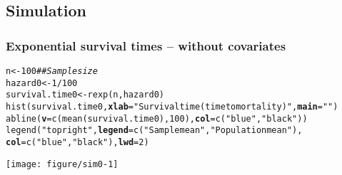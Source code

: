 \documentclass[color=usenames,dvipsnames]{beamer}\usepackage[]{graphicx}\usepackage[]{color}
\makeatletter
\newcommand{\hlnum}[1]{\textcolor[rgb]{0.69,0.494,0}{#1}}%
\newcommand{\hlstr}[1]{\textcolor[rgb]{0.749,0.012,0.012}{#1}}%
\newcommand{\hlcom}[1]{\textcolor[rgb]{0.514,0.506,0.514}{\textit{#1}}}%
\newcommand{\hlopt}[1]{\textcolor[rgb]{0,0,0}{#1}}%
\newcommand{\hlstd}[1]{\textcolor[rgb]{0,0,0}{#1}}%
\newcommand{\hlkwb}[1]{\textcolor[rgb]{0,0.341,0.682}{#1}}%
\newcommand{\hlkwc}[1]{\textcolor[rgb]{0,0,0}{\textbf{#1}}}%
\newcommand{\hlkwd}[1]{\textcolor[rgb]{0.004,0.004,0.506}{#1}}%
\newenvironment{kframe}{%
 \def\at@end@of@kframe{}%
 \ifinner\ifhmode%
  \def\at@end@of@kframe{\end{minipage}}%
  \begin{minipage}{\columnwidth}%
 \fi\fi%
 \def\FrameCommand##1{\hskip\@totalleftmargin \hskip-\fboxsep
 \colorbox{shadecolor}{##1}\hskip-\fboxsep
     \hskip-\linewidth \hskip-\@totalleftmargin \hskip\columnwidth}%
 \MakeFramed {\advance\hsize-\width
   \@totalleftmargin\z@ \linewidth\hsize
   \@setminipage}}%
 {\par\unskip\endMakeFramed%
 \at@end@of@kframe}
\newenvironment{knitrout}{}{} %
\makeatother
\begin{document}
\subsection{Simulation}


\begin{frame}[fragile]
  \frametitle{\large Exponential survival times -- without covariates}
\begin{knitrout}\scriptsize
{}\color{fgcolor}\begin{kframe}
\begin{alltt}
\hlstd{n} \hlkwb{<-} \hlnum{100}                          \hlcom{## Sample size}
\hlstd{hazard0} \hlkwb{<-} \hlnum{1}\hlopt{/}\hlnum{100}
\hlstd{survival.time0} \hlkwb{<-} \hlkwd{rexp}\hlstd{(n, hazard0)}
\hlkwd{hist}\hlstd{(survival.time0,} \hlkwc{xlab}\hlstd{=}\hlstr{"Survival time (time to mortality)"}\hlstd{,} \hlkwc{main}\hlstd{=}\hlstr{""}\hlstd{)}
\hlkwd{abline}\hlstd{(}\hlkwc{v}\hlstd{=}\hlkwd{c}\hlstd{(}\hlkwd{mean}\hlstd{(survival.time0),} \hlnum{100}\hlstd{),} \hlkwc{col}\hlstd{=}\hlkwd{c}\hlstd{(}\hlstr{"blue"}\hlstd{,} \hlstr{"black"}\hlstd{))}
\hlkwd{legend}\hlstd{(}\hlstr{"topright"}\hlstd{,} \hlkwc{legend}\hlstd{=}\hlkwd{c}\hlstd{(}\hlstr{"Sample mean"}\hlstd{,} \hlstr{"Population mean"}\hlstd{),}
       \hlkwc{col}\hlstd{=}\hlkwd{c}\hlstd{(}\hlstr{"blue"}\hlstd{,} \hlstr{"black"}\hlstd{),} \hlkwc{lwd}\hlstd{=}\hlnum{2}\hlstd{)}
\end{alltt}
\end{kframe}

{\centering \texttt{[image: figure/sim0-1]} 

}


\end{knitrout}
\end{frame}
\end{document}

